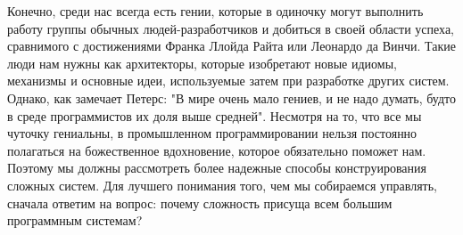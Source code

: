 \documentclass[11pt]{article}
\begin{document}
\par
Конечно, среди нас всегда есть гении, которые в одиночку могут выполнить работу группы обычных людей-разработчиков и добиться в своей области успеха, сравнимого с достижениями Франка Ллойда Райта или Леонардо да Винчи. Такие люди нам нужны как архитекторы, которые изобретают новые идиомы, механизмы и основные идеи, используемые затем при разработке других систем. Однако, как замечает Петерс: "В мире очень мало гениев, и не надо думать, будто в среде программистов их доля выше средней". Несмотря на то, что все мы чуточку гениальны, в промышленном программировании нельзя постоянно полагаться на божественное вдохновение, которое обязательно поможет нам. Поэтому мы должны рассмотреть более надежные способы конструирования сложных систем. Для лучшего понимания того, чем мы собираемся управлять, сначала ответим на вопрос: почему сложность присуща всем большим программным системам? 
\end{document}
